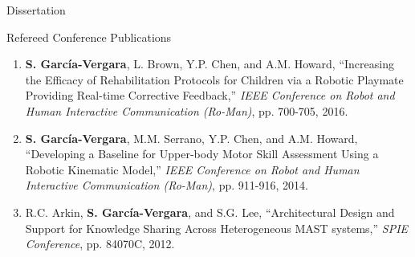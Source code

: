 \documentclass{resume} %
\newcommand{\sectionspace}{\vspace{3mm}}
\newcommand{\Sergio}{\textbf{S. Garc\'{i}a-Vergara}}
\begin{document}
\begin{rSection}{Dissertation}
\begin{rSubsection}{Refereed Conference Publications}{}{}{}
\begin{enumerate}
\item \Sergio, L. Brown, Y.P. Chen, and A.M. Howard, ``Increasing the Efficacy
  of Rehabilitation Protocols for Children via a Robotic Playmate Providing
  Real-time Corrective Feedback,'' \textit{IEEE Conference on Robot and Human
    Interactive Communication (Ro-Man)}, pp. 700-705, 2016.

\item \Sergio, M.M. Serrano, Y.P. Chen, and A.M. Howard, ``Developing a Baseline
  for Upper-body Motor Skill Assessment Using a Robotic Kinematic Model,''
  \textit{IEEE Conference on Robot and Human Interactive Communication
    (Ro-Man)}, pp. 911-916, 2014.

\item R.C. Arkin, \Sergio, and S.G. Lee, ``Architectural Design and Support for
  Knowledge Sharing Across Heterogeneous MAST systems,'' \textit{SPIE
    Conference}, pp. 84070C, 2012.

\end{enumerate}
\end{rSubsection}

\fi

\end{rSection}







\sectionspace
\end{document}
